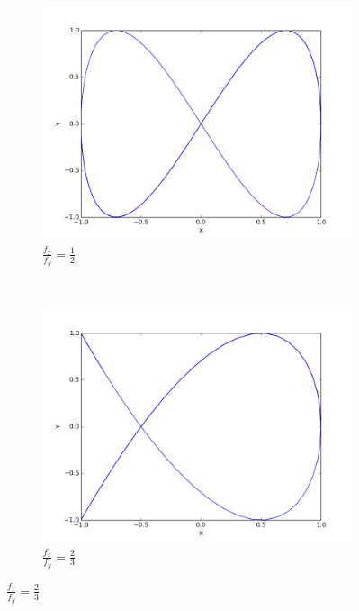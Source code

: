\documentclass{article}
\begin{document}
\begin{enumerate}
	\begin{figure}[h]
		\centering
		\begin{subfigure}{0.4\textwidth}
		\centering
		\includegraphics[width=0.9\linewidth]{fig1.png}
		\caption{$\frac{f_x}{f_y} = \frac{1}{2}$}
		\end{subfigure}
		~
		\begin{subfigure}{0.4\textwidth}
		\centering
		\includegraphics[width=0.9\linewidth]{fig2.png}
		\caption{$\frac{f_x}{f_y} = \frac{2}{3}$}
		\end{subfigure}
		

\end{figure}
\end{enumerate}
\end{document}
